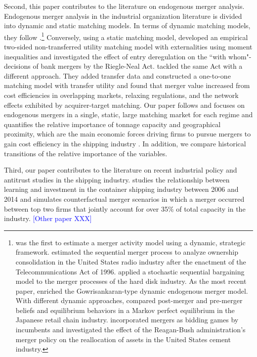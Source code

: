 \documentclass[10pt]{article}
\begin{document}
Second, this paper contributes to the literature on endogenous merger analysis. Endogenous merger analysis in the industrial organization literature is divided into dynamic and static matching models. 
In terms of dynamic matching models, they follow \cite{gowrisankaran1999dynamic}.\footnote{\cite{stahl2011dynamic} was the first to estimate a merger activity model using a dynamic, strategic framework. \cite{jeziorski2014effects} estimated the sequential merger process to analyze ownership consolidation in the United States radio industry after the enactment of the Telecommunications Act of 1996. \cite{igami2019mergers} applied a stochastic sequential bargaining model to the merger processes of the hard disk industry. As the most recent paper, \cite{hollenbeck2020horizontal} enriched the Gowrisankaran-type dynamic endogenous merger model. With different dynamic approaches, \cite{nishida2015better} compared post-merger and pre-merger beliefs and equilibrium behaviors in a Markov perfect equilibrium in the Japanese retail chain industry. \cite{perez2015building} incorporated mergers as bidding games by incumbents and investigated the effect of the Reagan-Bush administration's merger policy on the reallocation of assets in the United States cement industry.} Conversely, using a static matching model, \cite{uetake2019entry} developed an empirical two-sided non-transferred utility matching model with externalities using moment inequalities and investigated the effect of entry deregulation on the ``with whom"-decisions of bank mergers by the Riegle-Neal Act. 
\cite{akkus2015ms} tackled the same Act with a different approach. 
They added transfer data and constructed a one-to-one matching model with transfer utility and found that merger value increased from cost efficiencies in overlapping markets, relaxing regulations, and the network effects exhibited by acquirer-target matching. 
Our paper follows \cite{akkus2015ms} and focuses on endogenous mergers in a single, static, large matching market for each regime and quantifies the relative importance of tonnage capacity and geographical proximity, which are the main economic forces driving firms to pursue mergers to gain cost efficiency in the shipping industry \citep{notteboom2004container}. 
In addition, we compare historical transitions of the relative importance of the variables.

Third, our paper contributes to the literature on recent industrial policy and antitrust studies in the shipping industry. \cite{jeon2022learning} studies the relationship between learning and investment in the container shipping industry between 2006 and 2014 and simulates counterfactual merger scenarios in which a merger occurred between top two firms that jointly account for over 35\% of total capacity in the industry.
\textcolor{blue}{[Other paper XXX]}
\end{document}
